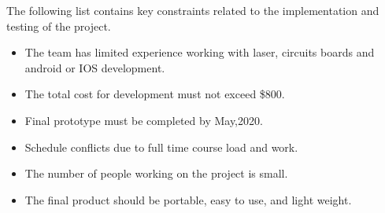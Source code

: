 The following list contains key constraints related to the implementation and testing of the project.

\begin{itemize}
  \item The team has limited experience working with laser, circuits boards and android or IOS development.
  \item The total cost for development must not exceed \$800.
  \item Final prototype must be completed by May,2020.
  \item Schedule conflicts due to full time course load and work.
  \item The number of people working on the project is small.
  \item The final product should be portable, easy to use, and light weight.
\end{itemize}
